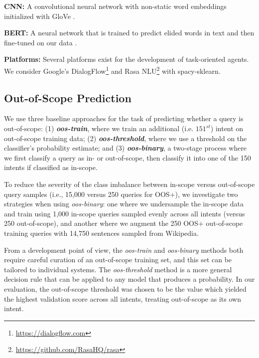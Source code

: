 \documentclass[11pt,a4paper]{article}
\newcommand{\luis}{Luis}
\newcommand{\tightparagraph}[1]{\noindent\textbf{#1:}}
\begin{document}
\tightparagraph{CNN}
A convolutional neural network with non-static word embeddings initialized with GloVe \citep{glove}.


\tightparagraph{BERT}
A neural network that is trained to predict elided words in text and then fine-tuned on our data \citep{bert}.

\tightparagraph{Platforms}
Several platforms exist for the development of task-oriented agents.
We consider Google's DialogFlow\footnote{\url{https://dialogflow.com}} and Rasa NLU\footnote{\url{https://github.com/RasaHQ/rasa}} with spacy-sklearn.

\subsection{Out-of-Scope Prediction}
We use three baseline approaches for the task of predicting whether a query is out-of-scope: (1) \textbf{\emph{oos-train}}, where we train an additional (i.e. $151^{st}$) intent on out-of-scope training data; (2) \textbf{\emph{oos-threshold}}, where we use a threshold on the classifier's probability estimate; and (3) \textbf{\emph{oos-binary}}, a two-stage process where we first classify a query as in- or out-of-scope, then classify it into one of the 150 intents if classified as in-scope. 

To reduce the severity of the class imbalance between in-scope versus out-of-scope query samples (i.e., 15,000 versus 250 queries for OOS+), we investigate two strategies when using \emph{oos-binary}: one where we undersample the in-scope data and train using 1,000 in-scope queries sampled evenly across all intents (versus 250 out-of-scope), and another where we augment the 250 OOS+ out-of-scope training queries with 14,750 sentences sampled from Wikipedia.

From a development point of view, the \emph{oos-train} and \emph{oos-binary} methods both require careful curation of an out-of-scope training set, and this set can be tailored to individual systems. The \emph{oos-threshold} method is a more general decision rule that can be applied to any model that produces a probability. In our evaluation, the out-of-scope threshold was chosen to be the value which yielded the highest validation score across all intents, treating out-of-scope as its own intent.
\end{document}

